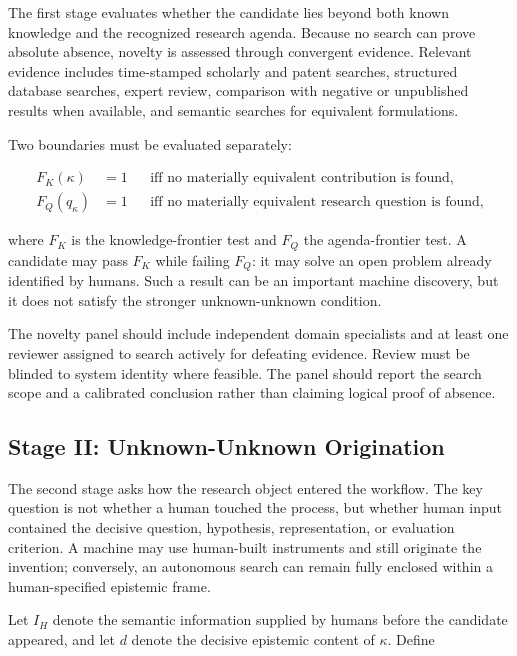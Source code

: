 The first stage evaluates whether the candidate lies beyond both known
knowledge and the recognized research agenda. Because no search can prove
absolute absence, novelty is assessed through convergent evidence. Relevant
evidence includes time-stamped scholarly and patent searches, structured
database searches, expert review, comparison with negative or unpublished
results when available, and semantic searches for equivalent formulations.

Two boundaries must be evaluated separately:

\begin{equation}
\begin{aligned}
F_K(\kappa)&=1
&&\text{iff no materially equivalent contribution is found},\\
F_Q(q_\kappa)&=1
&&\text{iff no materially equivalent research question is found},
\end{aligned}
\label{eq:frontier_tests}
\end{equation}

where $F_K$ is the knowledge-frontier test and $F_Q$ the agenda-frontier test.
A candidate may pass $F_K$ while failing $F_Q$: it may solve an open problem
already identified by humans. Such a result can be an important machine
discovery, but it does not satisfy the stronger unknown-unknown condition.

The novelty panel should include independent domain specialists and at least
one reviewer assigned to search actively for defeating evidence. Review must
be blinded to system identity where feasible. The panel should report the
search scope and a calibrated conclusion rather than claiming logical proof of
absence.

\subsection{\textbf{Stage II: Unknown-Unknown Origination}}

The second stage asks how the research object entered the workflow. The key
question is not whether a human touched the process, but whether human input
contained the decisive question, hypothesis, representation, or evaluation
criterion. A machine may use human-built instruments and still originate the
invention; conversely, an autonomous search can remain fully enclosed within a
human-specified epistemic frame.

Let $I_H$ denote the semantic information supplied by humans before the
candidate appeared, and let $d$ denote the decisive epistemic content of
$\kappa$. Define


